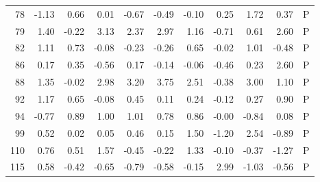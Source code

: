 \begin{table}[ht]
\begin{tabular}{rrrrrrrrrrl}
  78 & -1.13 & 0.66 & 0.01 & -0.67 & -0.49 & -0.10 & 0.25 & 1.72 & 0.37 & P \\ 
  79 & 1.40 & -0.22 & 3.13 & 2.37 & 2.97 & 1.16 & -0.71 & 0.61 & 2.60 & P \\ 
  82 & 1.11 & 0.73 & -0.08 & -0.23 & -0.26 & 0.65 & -0.02 & 1.01 & -0.48 & P \\ 
  86 & 0.17 & 0.35 & -0.56 & 0.17 & -0.14 & -0.06 & -0.46 & 0.23 & 2.60 & P \\ 
  88 & 1.35 & -0.02 & 2.98 & 3.20 & 3.75 & 2.51 & -0.38 & 3.00 & 1.10 & P \\ 
  92 & 1.17 & 0.65 & -0.08 & 0.45 & 0.11 & 0.24 & -0.12 & 0.27 & 0.90 & P \\ 
  94 & -0.77 & 0.89 & 1.00 & 1.01 & 0.78 & 0.86 & -0.00 & -0.84 & 0.08 & P \\ 
  99 & 0.52 & 0.02 & 0.05 & 0.46 & 0.15 & 1.50 & -1.20 & 2.54 & -0.89 & P \\ 
  110 & 0.76 & 0.51 & 1.57 & -0.45 & -0.22 & 1.33 & -0.10 & -0.37 & -1.27 & P \\ 
  115 & 0.58 & -0.42 & -0.65 & -0.79 & -0.58 & -0.15 & 2.99 & -1.03 & -0.56 & P \\ 
   \hline
\end{tabular}
\end{table}
